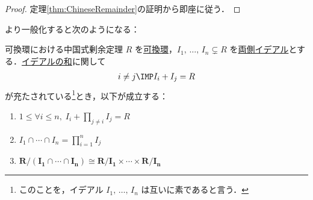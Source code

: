 \documentclass[geometry_main]{subfiles}
\begin{document}
\begin{proof}
	定理\ref{thm:ChineseRemainder}の証明から即座に従う．
\end{proof}

より一般化すると次のようになる：

\begin{mytheo}[label=thm:ChineseRemainder-ideal]{可換環における中国式剰余定理}
	$R$ を\underline{可換環}，$I_1,\, \dots ,\, I_n \subsetneq R$ を\hyperref[def:ideal]{両側イデアル}とする．\hyperref[def:subtract-prod-ideal]{イデアルの和}に関して
	\begin{align}
		i\neq j \IMP I_i + I_j = R
	\end{align}
	が充たされている\footnote{このことを，イデアル $I_1,\, \dots ,\, I_n$ は互いに素であると言う．}とき，以下が成立する：
	\begin{enumerate}
		\item $\displaystyle 1\le \forall i \le n,\; I_i + \prod_{j\neq i} I_j = R$
		\item $\displaystyle I_1 \cap \cdots \cap I_n = \prod_{i=1}^n I_j$
		\item $\bm{R/(I_1 \cap \cdots \cap I_n) \cong R/I_1 \times \cdots \times R/I_n}$ 
	\end{enumerate}
\end{mytheo}
\end{document}
